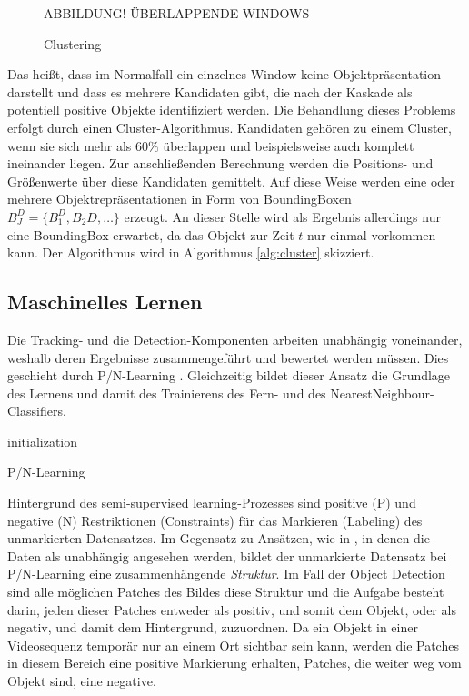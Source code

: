 	\begin{figure}
		\begin{centering}
			ABBILDUNG! ÜBERLAPPENDE WINDOWS
			\caption{Clustering}
			\label{abb:cluster}
			\par
		\end{centering}
	\end{figure}

	Das heißt, dass im Normalfall ein einzelnes Window keine Objektpräsentation darstellt und dass es mehrere Kandidaten gibt, die nach der Kaskade als potentiell positive Objekte identifiziert werden. Die Behandlung dieses Problems erfolgt durch einen Cluster-Algorithmus. Kandidaten gehören zu einem Cluster, wenn sie sich mehr als $60\%$ überlappen und beispielsweise auch komplett ineinander liegen. Zur anschließenden Berechnung werden die Positions- und Größenwerte über diese Kandidaten gemittelt. Auf diese Weise werden eine oder mehrere Objektrepräsentationen in Form von BoundingBoxen $B_J^D = \{B_1^D, B_2D, \dots\}$ erzeugt. An dieser Stelle wird als Ergebnis allerdings nur eine BoundingBox erwartet, da das Objekt zur Zeit $t$ nur einmal vorkommen kann. Der Algorithmus wird in Algorithmus \ref{alg:cluster} skizziert.

	\subsection{Maschinelles Lernen}
	\label{subsection:machine_learning}
	Die Tracking- und die Detection-Komponenten arbeiten unabhängig voneinander, weshalb deren Ergebnisse zusammengeführt und bewertet werden müssen. Dies geschieht durch P/N-Learning \cite{PNL}. Gleichzeitig bildet dieser Ansatz die Grundlage des Lernens und damit des Trainierens
	des Fern- und des NearestNeighbour-Classifiers.

	\begin{algorithm}
	\vspace{0.2cm}
	initialization\;
	\caption{P/N-Learning}
	\label{alg:learning}
	\vspace{0.2cm}
	\end{algorithm}

	Hintergrund des semi-supervised learning-Prozesses sind positive (P)	und negative (N) Restriktionen (Constraints) für das Markieren (Labeling)	des unmarkierten Datensatzes. Im Gegensatz zu Ansätzen, wie in \cite{TCL} \cite{CLU}, in denen die Daten als unabhängig angesehen werden, bildet der unmarkierte Datensatz bei P/N-Learning eine zusammenhängende \textit{Struktur}. Im Fall der Object Detection sind alle möglichen Patches des Bildes diese Struktur und die Aufgabe besteht darin, jeden dieser Patches entweder als positiv, und somit dem Objekt, oder als negativ, und damit dem Hintergrund, zuzuordnen. Da ein Objekt in einer Videosequenz temporär nur an einem Ort sichtbar sein kann, werden die Patches in diesem Bereich eine positive Markierung erhalten, Patches, die weiter weg vom Objekt sind, eine negative.

